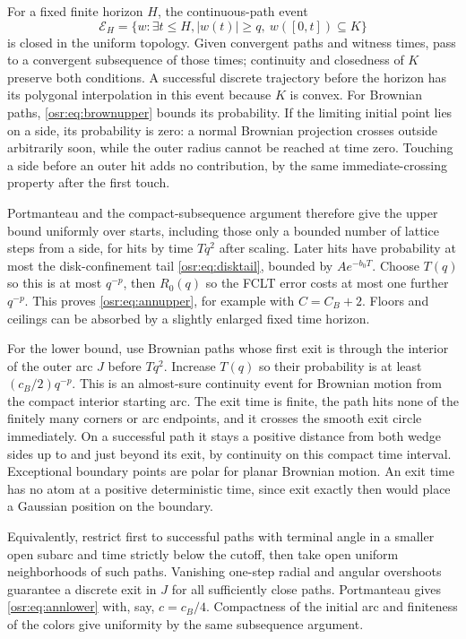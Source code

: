 \documentclass[11pt,letterpaper]{article}
\numberwithin{equation}{section}
\begin{document}
For a fixed finite horizon $H$, the continuous-path event
\[
 \mathcal E_H=\{w:\exists t\le H, |w(t)|\ge q,
                           \ w([0,t])\subseteq K\}
\]
is closed in the uniform topology. Given convergent paths and witness times, pass to a convergent subsequence of those times; continuity and closedness of $K$ preserve both conditions. A successful discrete trajectory before the horizon has its polygonal interpolation in this event because $K$ is convex. For Brownian paths, \eqref{osr:eq:brownupper} bounds its probability. If the limiting initial point lies on a side, its probability is zero: a normal Brownian projection crosses outside arbitrarily soon, while the outer radius cannot be reached at time zero. Touching a side before an outer hit adds no contribution, by the same immediate-crossing property after the first touch.

Portmanteau and the compact-subsequence argument therefore give the upper bound uniformly over starts, including those only a bounded number of lattice steps from a side, for hits by time $Tq^2$ after scaling. Later hits have probability at most the disk-confinement tail \eqref{osr:eq:disktail}, bounded by $Ae^{-b_0T}$. Choose $T(q)$ so this is at most $q^{-p}$, then $R_0(q)$ so the FCLT error costs at most one further $q^{-p}$. This proves \eqref{osr:eq:annupper}, for example with $C=C_B+2$. Floors and ceilings can be absorbed by a slightly enlarged fixed time horizon.

For the lower bound, use Brownian paths whose first exit is through the interior of the outer arc $J$ before $Tq^2$. Increase $T(q)$ so their probability is at least $(c_B/2)q^{-p}$. This is an almost-sure continuity event for Brownian motion from the compact interior starting arc. The exit time is finite, the path hits none of the finitely many corners or arc endpoints, and it crosses the smooth exit circle immediately. On a successful path it stays a positive distance from both wedge sides up to and just beyond its exit, by continuity on this compact time interval. Exceptional boundary points are polar for planar Brownian motion. An exit time has no atom at a positive deterministic time, since exit exactly then would place a Gaussian position on the boundary.

Equivalently, restrict first to successful paths with terminal angle in a smaller open subarc and time strictly below the cutoff, then take open uniform neighborhoods of such paths. Vanishing one-step radial and angular overshoots guarantee a discrete exit in $J$ for all sufficiently close paths. Portmanteau gives \eqref{osr:eq:annlower} with, say, $c=c_B/4$. Compactness of the initial arc and finiteness of the colors give uniformity by the same subsequence argument.
\end{document}
